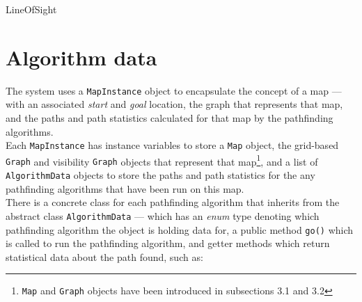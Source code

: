 \documentclass[12pt,notitlepage]{report}
\begin{document}
\begin{algorithm}
  \SetAlgoLined\DontPrintSemicolon
  \caption{{\sc LineOfSight}}
\end{algorithm} 

\section{Algorithm data}
The system uses a {\tt MapInstance} object to encapsulate the concept of a map --- with an associated {\em start} and {\em goal} location, the graph that represents that map, and the paths and path statistics calculated for that map by the pathfinding algorithms.\\

\noindent
Each {\tt MapInstance} has instance variables to store a {\tt Map} object, the grid-based {\tt Graph} and visibility {\tt Graph} objects that represent that map\footnote{{\tt Map} and {\tt Graph} objects have been introduced in subsections 3.1 and 3.2}, and a list of {\tt AlgorithmData} objects to store the paths and path statistics for the any pathfinding algorithms that have been run on this map.\\

\noindent
There is a concrete class for each pathfinding algorithm that inherits from the abstract class {\tt AlgorithmData} --- which  has an {\em enum} type denoting which pathfinding algorithm the object is holding data for, a public method {\tt go()} which is called to run the pathfinding algorithm, and getter methods which return statistical data about the path found, such as:
\end{document}
